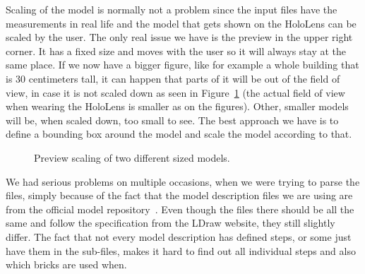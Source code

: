 \begin{description}[align=left]
	\newpage
		
	\item [Scaling of preview]
	Scaling of the model is normally not a problem since the input files have the measurements in real life and the model that gets shown on the HoloLens can be scaled by the user. The only real issue we have is the preview in the upper right corner. It has a fixed size and moves with the user so it will always stay at the same place. If we now have a bigger figure, like for example a whole building that is 30 centimeters tall, it can happen that parts of it will be out of the field of view, in case it is not scaled down as seen in Figure~\ref{fig:preview_scaling} (the actual field of view when wearing the HoloLens is smaller as on the figures). Other, smaller models will be, when scaled down, too small to see. The best approach we have is to define a bounding box around the model and scale the model according to that.
	
	\begin{figure}[!ht]
		\captionsetup{justification=centering}
		\centering
		\hfill
		\hfill
		\caption{Preview scaling of two different sized models.}
		\label{fig:preview_scaling}
	\end{figure}
	
	\item [Parsing]
	We had serious problems on multiple occasions, when we were trying to parse the files, simply because of the fact that the model description files we are using are from the official model repository~\cite{omr}. Even though the files there should be all the same and follow the specification from the LDraw website, they still slightly differ. The fact that not every model description has defined steps, or some just have them in the sub-files, makes it hard to find out all individual steps and also which bricks are used when.
	

\end{description}
